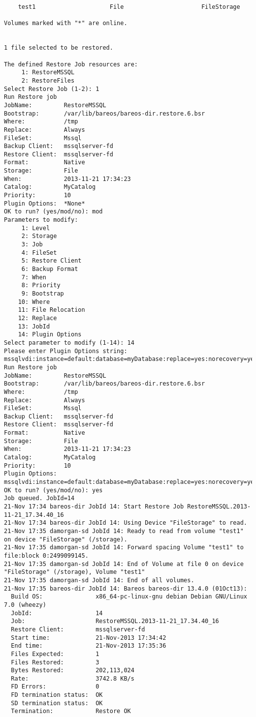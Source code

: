 \begin{verbatim}
    test1                     File                      FileStorage

Volumes marked with "*" are online.


1 file selected to be restored.

The defined Restore Job resources are:
     1: RestoreMSSQL
     2: RestoreFiles
Select Restore Job (1-2): 1
Run Restore job
JobName:         RestoreMSSQL
Bootstrap:       /var/lib/bareos/bareos-dir.restore.6.bsr
Where:           /tmp
Replace:         Always
FileSet:         Mssql
Backup Client:   mssqlserver-fd
Restore Client:  mssqlserver-fd
Format:          Native
Storage:         File
When:            2013-11-21 17:34:23
Catalog:         MyCatalog
Priority:        10
Plugin Options:  *None*
OK to run? (yes/mod/no): mod
Parameters to modify:
     1: Level
     2: Storage
     3: Job
     4: FileSet
     5: Restore Client
     6: Backup Format
     7: When
     8: Priority
     9: Bootstrap
    10: Where
    11: File Relocation
    12: Replace
    13: JobId
    14: Plugin Options
Select parameter to modify (1-14): 14
Please enter Plugin Options string: mssqlvdi:instance=default:database=myDatabase:replace=yes:norecovery=yes
Run Restore job
JobName:         RestoreMSSQL
Bootstrap:       /var/lib/bareos/bareos-dir.restore.6.bsr
Where:           /tmp
Replace:         Always
FileSet:         Mssql
Backup Client:   mssqlserver-fd
Restore Client:  mssqlserver-fd
Format:          Native
Storage:         File
When:            2013-11-21 17:34:23
Catalog:         MyCatalog
Priority:        10
Plugin Options:  mssqlvdi:instance=default:database=myDatabase:replace=yes:norecovery=yes
OK to run? (yes/mod/no): yes
Job queued. JobId=14
21-Nov 17:34 bareos-dir JobId 14: Start Restore Job RestoreMSSQL.2013-11-21_17.34.40_16
21-Nov 17:34 bareos-dir JobId 14: Using Device "FileStorage" to read.
21-Nov 17:35 damorgan-sd JobId 14: Ready to read from volume "test1" on device "FileStorage" (/storage).
21-Nov 17:35 damorgan-sd JobId 14: Forward spacing Volume "test1" to file:block 0:2499099145.
21-Nov 17:35 damorgan-sd JobId 14: End of Volume at file 0 on device "FileStorage" (/storage), Volume "test1"
21-Nov 17:35 damorgan-sd JobId 14: End of all volumes.
21-Nov 17:35 bareos-dir JobId 14: Bareos bareos-dir 13.4.0 (01Oct13):
  Build OS:               x86_64-pc-linux-gnu debian Debian GNU/Linux 7.0 (wheezy)
  JobId:                  14
  Job:                    RestoreMSSQL.2013-11-21_17.34.40_16
  Restore Client:         mssqlserver-fd
  Start time:             21-Nov-2013 17:34:42
  End time:               21-Nov-2013 17:35:36
  Files Expected:         1
  Files Restored:         3
  Bytes Restored:         202,113,024
  Rate:                   3742.8 KB/s
  FD Errors:              0
  FD termination status:  OK
  SD termination status:  OK
  Termination:            Restore OK

\end{verbatim}
\normalsize
